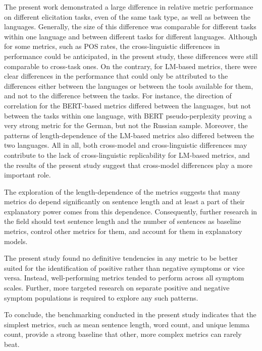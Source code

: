 The present work demonstrated a large difference in relative metric performance on different elicitation tasks, even of the same task type, as well as between the languages. Generally, the size of this difference was comparable for different tasks within one language and between different tasks for different languages. Although for some metrics, such as POS rates, the cross-linguistic differences in performance could be anticipated, in the present study, these differences were still comparable to cross-task ones. On the contrary, for LM-based metrics, there were clear differences in the performance that could only be attributed to the differences either between the languages or between the tools available for them, and not to the difference between the tasks. For instance, the direction of correlation for the BERT-based metrics differed between the languages, but not between the tasks within one language, with BERT pseudo-perplexity proving a very strong metric for the German, but not the Russian sample. Moreover, the patterns of length-dependence of the LM-based metrics also differed between the two languages. All in all, both cross-model and cross-linguistic differences may contribute to the lack of cross-linguistic replicability for LM-based metrics, and the results of the present study suggest that cross-model differences play a more important role.

The exploration of the length-dependence of the metrics suggests that many metrics do depend significantly on sentence length and at least a part of their explanatory power comes from this dependence. Consequently, further research in the field should test sentence length and the number of sentences as baseline metrics, control other metrics for them, and account for them in explanatory models.

The present study found no definitive tendencies in any metric to be better suited for the identification of positive rather than negative symptoms or vice versa. Instead, well-performing metrics tended to perform across all symptom scales. Further, more targeted research on separate positive and negative symptom populations is required to explore any such patterns.

To conclude, the benchmarking conducted in the present study indicates that the simplest metrics, such as mean sentence length, word count, and unique lemma count, provide a strong baseline that other, more complex metrics can rarely beat.
